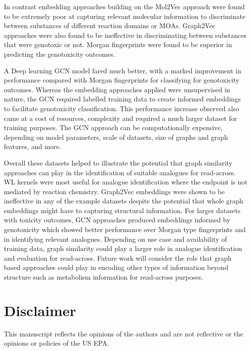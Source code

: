\documentclass[
  super,
  preprint,
  3p]{elsarticle}
\begin{document}
In contrast embedding approaches building on the Mol2Vec approach were
found to be extremely poor at capturing relevant molecular information
to discriminate between substances of different reaction domains or
MOAs. Graph2Vec approaches were also found to be ineffective in
discriminating between substances that were genotoxic or not. Morgan
fingerprints were found to be superior in predicting the genotoxicity
outcomes.

A Deep learning GCN model fared much better, with a marked improvement
in performance compared with Morgan fingerprints for classifying for
genotoxicity outcomes. Whereas the embedding approaches applied were
unsupervised in nature, the GCN required labelled training data to
create informed embeddings to facilitate genotoxicity classification.
This performance increase observed also came at a cost of resources,
complexity and required a much larger dataset for training purposes. The
GCN approach can be computationally expensive, depending on model
parameters, scale of datasets, size of graphs and graph features, and
more.

Overall these datasets helped to illustrate the potential that graph
similarity approaches can play in the identification of suitable
analogues for read-across. WL kernels were most useful for analogue
identification where the endpoint is not mediated by reaction chemistry.
Graph2Vec embeddings were shown to be ineffective in any of the example
datasets despite the potential that whole graph embeddings might have to
capturing structural information. For larger datasets with toxicity
outcomes, GCN approaches produced embeddings informed by genotoxicity
which showed better performance over Morgan type fingerprints and in
identifying relevant analogues. Depending on use case and availability
of training data, graph similarity could play a larger role in analogue
identification and evaluation for read-across. Future work will consider
the role that graph based approaches could play in encoding other types
of information beyond structure such as metabolism information for
read-across purposes.

\section*{Disclaimer}\label{disclaimer}

This manuscript reflects the opinions of the authors and are not
reflective or the opinions or policies of the US EPA.
\end{document}
